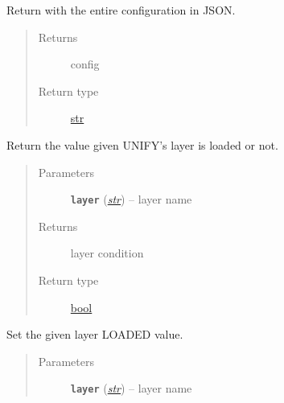 \documentclass[letterpaper,10pt,english]{sphinxmanual}
\begin{document}
\begin{fulllineitems}
\begin{fulllineitems}
\end{fulllineitems}


\begin{fulllineitems}
\label{util/misc:escape.util.misc.ESCAPEConfig.dump}
Return with the entire configuration in JSON.
\begin{quote}\begin{description}
\item[{Returns}] \leavevmode
config

\item[{Return type}] \leavevmode
\href{https://docs.python.org/2.7/library/functions.html\#str}{str}

\end{description}\end{quote}

\end{fulllineitems}


\begin{fulllineitems}
\label{util/misc:escape.util.misc.ESCAPEConfig.is_loaded}
Return the value given UNIFY's layer is loaded or not.
\begin{quote}\begin{description}
\item[{Parameters}] \leavevmode
\textbf{\texttt{layer}} (\href{https://docs.python.org/2.7/library/functions.html\#str}{\emph{str}}) -- layer name

\item[{Returns}] \leavevmode
layer condition

\item[{Return type}] \leavevmode
\href{https://docs.python.org/2.7/library/functions.html\#bool}{bool}

\end{description}\end{quote}

\end{fulllineitems}


\begin{fulllineitems}
\label{util/misc:escape.util.misc.ESCAPEConfig.set_loaded}
Set the given layer LOADED value.
\begin{quote}\begin{description}
\item[{Parameters}] \leavevmode
\textbf{\texttt{layer}} (\href{https://docs.python.org/2.7/library/functions.html\#str}{\emph{str}}) -- layer name


\end{description}
\end{quote}
\end{fulllineitems}
\end{fulllineitems}
\end{document}
